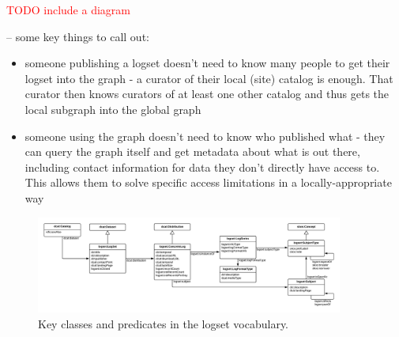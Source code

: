 \textcolor{red}{TODO include a diagram}


-- some key things to call out:
\begin{itemize}
\item someone publishing a logset doesn't need to know many people to get their 
      logset into the graph - a curator of their local (site) catalog is enough. 
      That curator then knows curators of at least one other catalog and thus 
      gets the local 
      subgraph into the global graph
\item someone using the graph doesn't need to know who published what - they can
      query the graph itself and get metadata about what is out there, including contact 
      information for data they don't directly have access to. This allows them to 
      solve specific access limitations in a locally-appropriate way
\end{itemize}

\begin{figure}
\includegraphics[width=0.9\textwidth]{logset-key-classes.png}
\caption{Key classes and predicates in the logset vocabulary. }
\label{f:logset-classes}
\end{figure}

